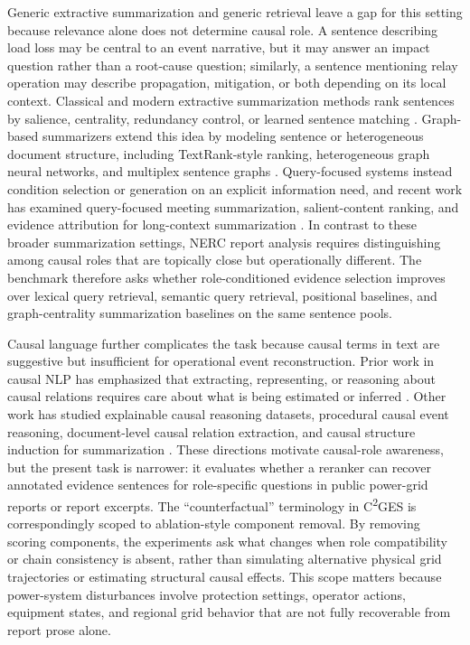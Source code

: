 \documentclass{article}
\begin{document}
Generic extractive summarization and generic retrieval leave a gap for this setting because relevance alone does not determine causal role. A sentence describing load loss may be central to an event narrative, but it may answer an impact question rather than a root-cause question; similarly, a sentence mentioning relay operation may describe propagation, mitigation, or both depending on its local context. Classical and modern extractive summarization methods rank sentences by salience, centrality, redundancy control, or learned sentence matching \cite{zhong2020extractive,bi2021aredsum,joshi2022ranksuman}. Graph-based summarizers extend this idea by modeling sentence or heterogeneous document structure, including TextRank-style ranking, heterogeneous graph neural networks, and multiplex sentence graphs \cite{khor2021text,wang2020heterogeneous,jing2021multiplex,cui2020enhancing}. Query-focused systems instead condition selection or generation on an explicit information need, and recent work has examined query-focused meeting summarization, salient-content ranking, and evidence attribution for long-context summarization \cite{vig2022exploring,liu2023rank,sotudeh2024rank,wright2025unstructured}. In contrast to these broader summarization settings, NERC report analysis requires distinguishing among causal roles that are topically close but operationally different. The benchmark therefore asks whether role-conditioned evidence selection improves over lexical query retrieval, semantic query retrieval, positional baselines, and graph-centrality summarization baselines on the same sentence pools.

Causal language further complicates the task because causal terms in text are suggestive but insufficient for operational event reconstruction. Prior work in causal NLP has emphasized that extracting, representing, or reasoning about causal relations requires care about what is being estimated or inferred \cite{feder2022causal,kcman2023causal,gao2023chatgpt,wang2024causalbench}. Other work has studied explainable causal reasoning datasets, procedural causal event reasoning, document-level causal relation extraction, and causal structure induction for summarization \cite{du2022ecare,zhang2023causal,wang2024documentlevel,chen2023inducing}. These directions motivate causal-role awareness, but the present task is narrower: it evaluates whether a reranker can recover annotated evidence sentences for role-specific questions in public power-grid reports or report excerpts. The ``counterfactual'' terminology in C\textsuperscript{2}GES is correspondingly scoped to ablation-style component removal. By removing scoring components, the experiments ask what changes when role compatibility or chain consistency is absent, rather than simulating alternative physical grid trajectories or estimating structural causal effects. This scope matters because power-system disturbances involve protection settings, operator actions, equipment states, and regional grid behavior that are not fully recoverable from report prose alone.
\end{document}
